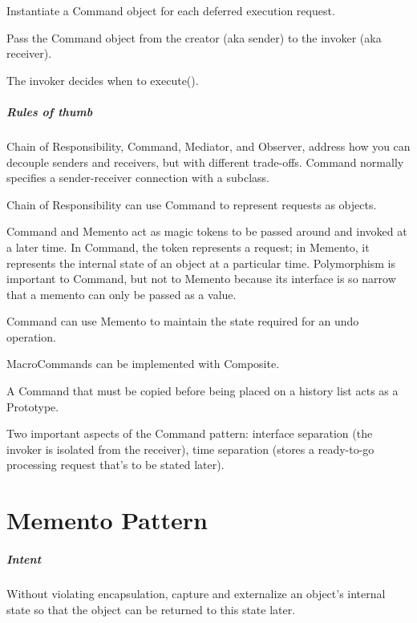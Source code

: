 \documentclass{book}
\begin{document}
    Instantiate a Command object for each deferred execution request.

    Pass the Command object from the creator (aka sender) to the invoker (aka receiver).

    The invoker decides when to execute().
\paragraph{Rules of thumb}\mbox{}
    Chain of Responsibility, Command, Mediator, and Observer, address how you can decouple senders and receivers, but with different trade-offs.
    Command normally specifies a sender-receiver connection with a subclass.

    Chain of Responsibility can use Command to represent requests as objects.

    Command and Memento act as magic tokens to be passed around and invoked at a later time.
    In Command, the token represents a request; in Memento, it represents the internal state of an object at a particular time.
    Polymorphism is important to Command, but not to Memento because its interface is so narrow that a memento can only be passed as a value.

    Command can use Memento to maintain the state required for an undo operation.

    MacroCommands can be implemented with Composite.

    A Command that must be copied before being placed on a history list acts as a Prototype.

    Two important aspects of the Command pattern: interface separation (the invoker is isolated from the receiver), time separation (stores a ready-to-go processing request that's to be stated later).

\chapter{Memento Pattern}\label{MementoPattern}
\paragraph{Intent}
    Without violating encapsulation, capture and externalize an object's internal state so that the object can be returned to this state later.
\end{document}
